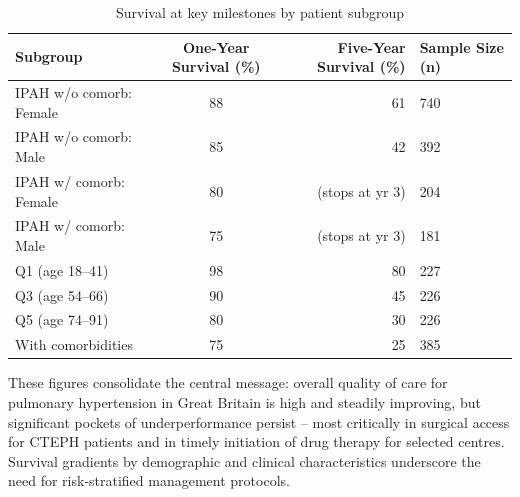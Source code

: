 \documentclass[11pt,a4paper]{article}
\begin{document}
\begin{table}[H]
\centering
\small
\caption{Survival at key milestones by patient subgroup}
\begin{tabularx}{\textwidth}{lcrX}
\toprule
Subgroup & One-Year Survival (\%) & Five-Year Survival (\%) & Sample Size (n) \\
\midrule
IPAH w/o comorb: Female & 88 & 61 & 740 \\
IPAH w/o comorb: Male & 85 & 42 & 392 \\
IPAH w/ comorb: Female & 80 & (stops at yr 3) & 204 \\
IPAH w/ comorb: Male & 75 & (stops at yr 3) & 181 \\
Q1 (age 18--41) & 98 & 80 & 227 \\
Q3 (age 54--66) & 90 & 45 & 226 \\
Q5 (age 74--91) & 80 & 30 & 226 \\
With comorbidities & 75 & 25 & 385 \\
\bottomrule
\end{tabularx}
\end{table}

These figures consolidate the central message: overall quality of care for pulmonary hypertension in Great Britain is high and steadily improving, but significant pockets of underperformance persist -- most critically in surgical access for CTEPH patients and in timely initiation of drug therapy for selected centres. Survival gradients by demographic and clinical characteristics underscore the need for risk-stratified management protocols.
\end{document}

